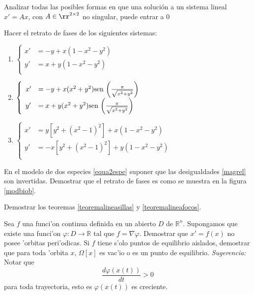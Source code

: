 \begin{ejercicio}{} Analizar todas las posibles formas en que una
solución a un sistema lineal $x'=Ax$, con $A\in\rr^{2\times 2}$ no
singular, puede entrar a $0$
\end{ejercicio}

\begin{ejercicio}{} Hacer el retrato de fases de los siguientes
sistemas:
\begin{enumerate}
\item   $\left\{%
\begin{array}{ll}
 x'&=-y+x(1-x^2-y^2)\\
    y'&=x+y(1-x^2-y^2)\\
\end{array}%
\right.$
\item $
\left\{
    \begin{array}{ll}
  x'&=-y+x(x^2+y^2)\hbox{sen }
  \bigg(\frac{\pi}{\sqrt{x^2+y^2}}\bigg)\\
    y'&=x+y(x^2+y^2)\hbox{sen
 }\bigg(\frac{\pi}{\sqrt{x^2+y^2}}\bigg)\\
 \end{array}
 \right.$

\item $
   \left\{%
 \begin{array}{ll}
  x'&=y[y^2+(x^2-1)^2]+x(1-x^2-y^2)\\
     y'&=-x[y^2+(x^2-1)^2]+y(1-x^2-y^2)\\
 \end{array}%
\right.
$
\end{enumerate}
\end{ejercicio}

\begin{ejercicio}{} En el modelo de dos especies \eqref{equa2espe}
suponer que las desigualdades \eqref{magrel} son invertidas.
Demostrar que el retrato de fases es como se muestra en la figura
\ref{modbiob}.

\end{ejercicio}



\begin{ejercicio}{} Demostrar los teoremas \ref{teoremalineasillas}
y \ref{teoremalineafocos}.
\end{ejercicio}



\begin{ejercicio}{} Sea $f$ una funci'on continua definida en un
abierto $D$ de $\mathbb{R}^n$. Supongamos que existe una funci'on
$\varphi:D\to\mathbb{R}$ tal que $f=\nabla\varphi$. Demostrar que
$x'=f(x)$ no posee 'orbitas peri'odicas. Si $f$ tiene s'olo puntos
de equilibrio aislados, demostrar que para toda 'orbita $x$,
$\Omega[x]$ es vac'io o es un punto de equilibrio.
\emph{Sugerencia:} Notar que
\[
    \frac{d\varphi(x(t))}{dt}>0
\]
para toda trayectoria, esto es $\varphi(x(t))$ es creciente.

\end{ejercicio}

